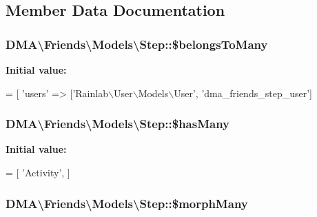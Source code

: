 \subsection{Member Data Documentation}
\hypertarget{classDMA_1_1Friends_1_1Models_1_1Step_ac0b25912a2d3c62aa72e15e443648d81}{
\subsubsection[{\$belongs\+To\+Many}]{\setlength{\rightskip}{0pt plus 5cm}D\+M\+A\textbackslash{}\+Friends\textbackslash{}\+Models\textbackslash{}\+Step\+::\$belongs\+To\+Many}}\label{classDMA_1_1Friends_1_1Models_1_1Step_ac0b25912a2d3c62aa72e15e443648d81}
{\bfseries Initial value\+:}
\begin{DoxyCode}
= [
        \textcolor{stringliteral}{'users'} => [\textcolor{stringliteral}{'Rainlab\(\backslash\)User\(\backslash\)Models\(\backslash\)User'}, \textcolor{stringliteral}{'dma\_friends\_step\_user'}]
\end{DoxyCode}
\hypertarget{classDMA_1_1Friends_1_1Models_1_1Step_a647b3d45c63c48faab1ad4b33b9be8a0}{
\subsubsection[{\$has\+Many}]{\setlength{\rightskip}{0pt plus 5cm}D\+M\+A\textbackslash{}\+Friends\textbackslash{}\+Models\textbackslash{}\+Step\+::\$has\+Many}}\label{classDMA_1_1Friends_1_1Models_1_1Step_a647b3d45c63c48faab1ad4b33b9be8a0}
{\bfseries Initial value\+:}
\begin{DoxyCode}
= [
        \textcolor{stringliteral}{'Activity'},
    ]
\end{DoxyCode}
\hypertarget{classDMA_1_1Friends_1_1Models_1_1Step_ae1aa1ff83758491327ea35861828b233}{
\subsubsection[{\$morph\+Many}]{\setlength{\rightskip}{0pt plus 5cm}D\+M\+A\textbackslash{}\+Friends\textbackslash{}\+Models\textbackslash{}\+Step\+::\$morph\+Many}}\label{classDMA_1_1Friends_1_1Models_1_1Step_ae1aa1ff83758491327ea35861828b233}
